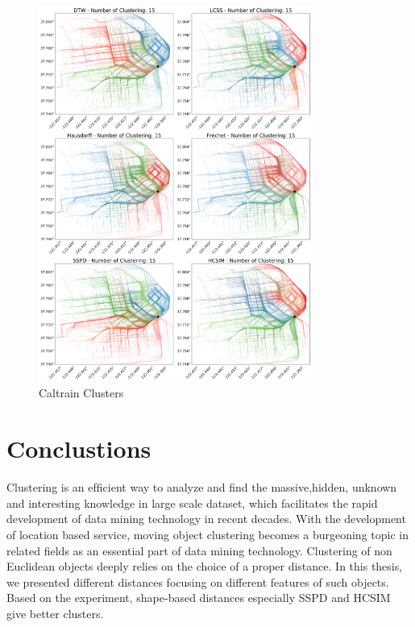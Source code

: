 \documentclass[a4paper, 12pt]{article}
\begin{document}
\begin{figure}[ht]
    \centering
    \includegraphics[width=0.8\textwidth]{Caltrain Plots.png}
    \caption{Caltrain Clusters}
    \label{fig28}
\end{figure}

\section{Conclustions}
Clustering is an efﬁcient way to analyze and ﬁnd the massive,hidden, unknown and interesting knowledge in large scale dataset, which facilitates the rapid development of data mining technology in recent decades. With the development of location based service, moving object
clustering becomes a burgeoning topic in related ﬁelds as an essential part of data mining technology. Clustering of non Euclidean objects deeply relies on the choice of a proper distance. In this thesis, we presented different distances focusing on different features of such objects. Based on the experiment, shape-based distances especially SSPD and HCSIM give better clusters.

\pagebreak


\end{document}
